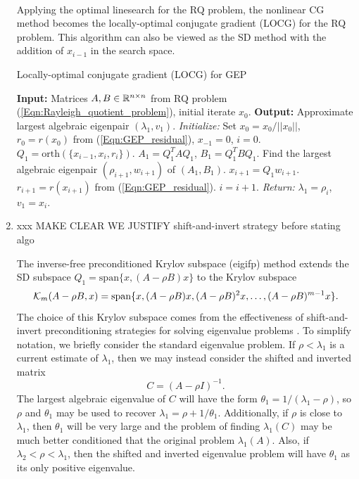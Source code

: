 \begin{enumerate}
\


Applying the optimal linesearch for the RQ problem, the nonlinear CG method becomes the locally-optimal conjugate gradient (LOCG) for the RQ problem.  This algorithm can also be viewed as the SD method with the addition of $x_{i-1}$ in the search space.

\begin{algorithm}[H]
\caption{Locally-optimal conjugate gradient (LOCG) for GEP}	\label{Alg:LOCG}

\begin{algorithmic}[1]
	\Statex		\textbf{Input:} Matrices $A, B \in {\mathbb R}^{n \times n}$ from RQ  problem (\ref{Eqn:Rayleigh_quotient_problem}), initial iterate $x_0$.
	\Statex 	\textbf{Output:} Approximate largest algebraic eigenpair $(\lambda_1, v_1)$.
	\State		\textit{Initialize:} Set $x_0 = x_0/||x_0||$, $r_0 = r(x_0)$ from  (\ref{Eqn:GEP_residual}), $x_{-1} = 0$, $i = 0$.
		\State	$Q_1 = \text{orth}(\{x_{i-1}, x_i, r_i\})$.
		\State	$A_1 = Q_1^TAQ_1$, $B_1 = Q_1^TBQ_1$.
		\State	Find the largest algebraic eigenpair $(\rho_{i+1}, w_{i+1})$ of $(A_1, B_1)$.
		\State	$x_{i+1} = Q_1w_{i+1}$.
		\State	$r_{i+1} =r(x_{i+1})$ from (\ref{Eqn:GEP_residual}).
		\State 	$i = i + 1$.
	\EndWhile
	\State		\textit{Return:} $\lambda_1 = \rho_i$, $v_1 = x_i$.
\end{algorithmic}

\end{algorithm}





\item


xxx MAKE CLEAR WE JUSTIFY shift-and-invert strategy before stating algo

The inverse-free preconditioned Krylov subspace (eigifp) method extends the SD subspace $Q_1 = \text{span}\{x, (A-\rho B)x\}$ to the Krylov subspace
\begin{equation} 		\label{Eqn:eigifp_Krylov_subspace}
{\mathcal K}_m(A - \rho B, x) = \text{span} \{ x, (A-\rho B)x, (A-\rho B)^2x, \ldots, (A-\rho B)^{m-1}x \}.
\end{equation}
The choice of this Krylov subspace comes from the effectiveness of shift-and-invert preconditioning strategies for solving eigenvalue problems \cite[Chapter 8]{saad2011numerical}.  To simplify notation, we briefly consider the standard eigenvalue problem.  If $\rho < \lambda_1$ is a current estimate of $\lambda_1$, then we may instead consider the shifted and inverted matrix 
\begin{equation}			\label{Eqn:shift-and-invert-SEP}
C = (A- \rho I)^{-1}.
\end{equation}
The largest algebraic eigenvalue of $C$ will have the form $\theta_1 = 1/(\lambda_1 - \rho)$, so $\rho$ and $\theta_1$ may be used to recover $\lambda_1 = \rho + 1/\theta_1$.  Additionally, if $\rho$ is close to $\lambda_1$, then $\theta_1$ will be very large and the problem of finding $\lambda_1(C)$ may be much better conditioned that the original problem $\lambda_1(A)$.  Also, if $\lambda_2 < \rho < \lambda_1$, then the shifted and inverted eigenvalue problem will have $\theta_1$ as its only positive eigenvalue.


\end{enumerate}
